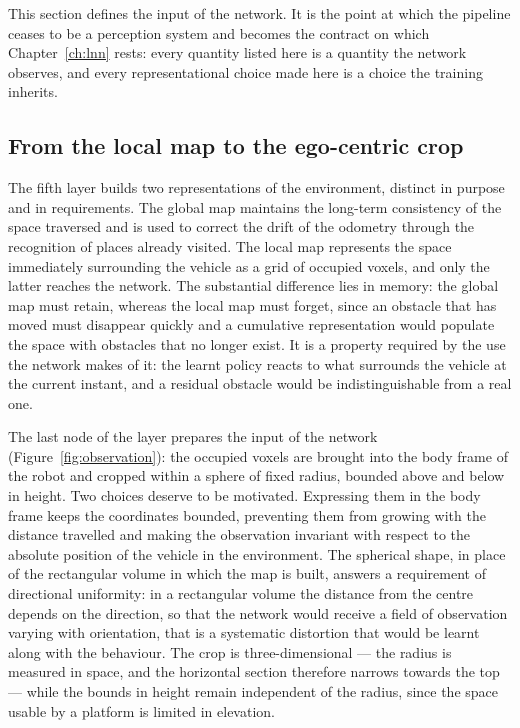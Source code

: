 This section defines the input of the network. It is the point at which the
pipeline ceases to be a perception system and becomes the contract on which
Chapter~\ref{ch:lnn} rests: every quantity listed here is a quantity the network
observes, and every representational choice made here is a choice the training
inherits.

\subsection{From the local map to the ego-centric crop}
\label{sec:observation-map}

The fifth layer builds two representations of the environment, distinct in
purpose and in requirements. The global map maintains the long-term consistency
of the space traversed and is used to correct the drift of the odometry through
the recognition of places already visited. The local map represents the space
immediately surrounding the vehicle as a grid of occupied voxels, and only the
latter reaches the network. The substantial difference lies in memory: the
global map must retain, whereas the local map must forget, since an obstacle
that has moved must disappear quickly and a cumulative representation would
populate the space with obstacles that no longer exist. It is a property
required by the use the network makes of it: the learnt policy reacts to what
surrounds the vehicle at the current instant, and a residual obstacle would be
indistinguishable from a real one.

The last node of the layer prepares the input of the network
(Figure~\ref{fig:observation}): the occupied voxels are brought into the body
frame of the robot and cropped within a sphere of fixed radius, bounded above
and below in height. Two choices deserve to be motivated. Expressing them in the
body frame keeps the coordinates bounded, preventing them from growing with the
distance travelled and making the observation invariant with respect to the
absolute position of the vehicle in the environment. The spherical shape, in
place of the rectangular volume in which the map is built, answers a requirement
of directional uniformity: in a rectangular volume the distance from the centre
depends on the direction, so that the network would receive a field of
observation varying with orientation, that is a systematic distortion that would
be learnt along with the behaviour. The crop is three-dimensional --- the radius
is measured in space, and the horizontal section therefore narrows towards the
top --- while the bounds in height remain independent of the radius, since the
space usable by a platform is limited in elevation.

